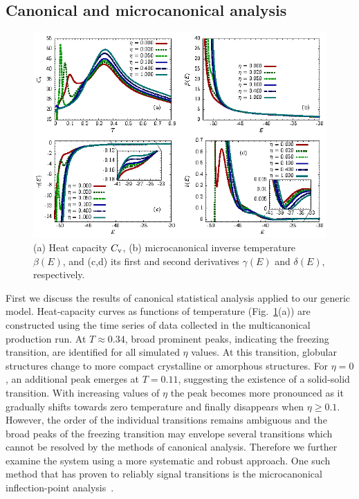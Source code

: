 \documentclass[12pt]{report}
\begin{document}
\subsection{Canonical and microcanonical analysis}
\begin{figure}
\begin{center}
    \includegraphics[width=1.0\textwidth]{chapter6Figs/Fig2.eps}%
    \caption{\label{can_mic_analysis}
    (a) Heat capacity $C_{\rm v}$, (b)
microcanonical inverse temperature $\beta(E)$, and (c,d) its first and
second derivatives $\gamma(E)$ and $\delta(E)$, respectively.}
\end{center}
\end{figure}
%
First we discuss the results of canonical statistical analysis applied to
our generic model. Heat-capacity curves as functions of temperature
(Fig.~\ref{can_mic_analysis}(a)) are constructed using the time series
of data collected in the multicanonical production run. At $T \approx
0.34$, broad prominent peaks, indicating the freezing transition, are
identified for all simulated $\eta$ values. At this transition, globular
structures change to more compact crystalline or amorphous structures.
For $\eta = 0$, an additional peak emerges at $T=0.11$, suggesting the
existence of a solid-solid transition. With increasing values of $\eta$
the peak becomes more pronounced as it gradually shifts towards zero
temperature and finally disappears when $\eta \geq 0.1$. However, the
order of the individual transitions remains ambiguous and the broad
peaks of the freezing transition may envelope several transitions which
cannot be resolved by the methods of canonical analysis. Therefore we
further examine the system using a more systematic 
and robust approach. One such method that has proven to reliably
signal transitions is the microcanonical inflection-point
analysis~\cite{Schnabel2011}.
\end{document}
